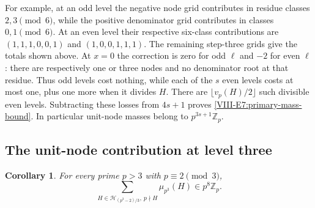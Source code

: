 \documentclass[11pt,letterpaper]{article}
\newtheorem{corollary}[theorem]{Corollary}
\numberwithin{equation}{section}
\begin{document}
For example, at an odd level the negative node grid contributes
in residue classes $2,3\pmod6$, while the positive denominator grid
contributes in classes $0,1\pmod6$. At an even level their respective
six-class contributions are $(1,1,1,0,0,1)$ and $(1,0,0,1,1,1)$.
The remaining step-three grids give the totals shown above.
At $x=0$ the correction is zero for odd $\ell$ and $-2$ for even
$\ell$: there are respectively one or three nodes and no denominator
root at that residue. Thus odd levels cost nothing, while each of the
$s$ even levels costs at most one, plus one more when it divides $H$.
There are $\lfloor v_p(H)/2\rfloor$ such divisible even levels.
Subtracting these losses from $4s+1$ proves
\eqref{VIII-E7:primary-mass-bound}. In particular unit-node masses belong
to $p^{3s+1}\mathbb Z_p$.

\subsection{The unit-node contribution at level three}
\begin{corollary}\label{VIII-E7:primary-unit-r3}
For every prime $p>3$ with $p\equiv2\pmod3$,
\[
 \sum_{H\in\mathcal H_{(p^3-2)/3},\ p\nmid H}\mu_{p^3}(H)
 \in p^8\mathbb Z_p.
\]
\end{corollary}
\end{document}
